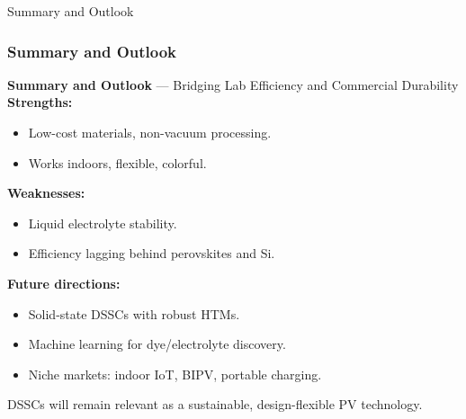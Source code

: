 \documentclass[aspectratio=169]{beamer}
\begin{document}
\begin{frame}{Summary and Outlook}
\frametitle{Summary and Outlook}

\textbf{Summary and Outlook} — Bridging Lab Efficiency and Commercial Durability
\textbf{Strengths:}
\begin{itemize}
\item Low-cost materials, non-vacuum processing.
\item Works indoors, flexible, colorful.
\end{itemize}
\textbf{Weaknesses:}
\begin{itemize}
\item Liquid electrolyte stability.
\item Efficiency lagging behind perovskites and Si.
\end{itemize}
\textbf{Future directions:}
\begin{itemize}
\item Solid-state DSSCs with robust HTMs.
\item Machine learning for dye/electrolyte discovery.
\item Niche markets: indoor IoT, BIPV, portable charging.
\end{itemize}
DSSCs will remain relevant as a sustainable, design-flexible PV technology.
\cite{Grätzel2021}
\end{frame}
\end{document}
